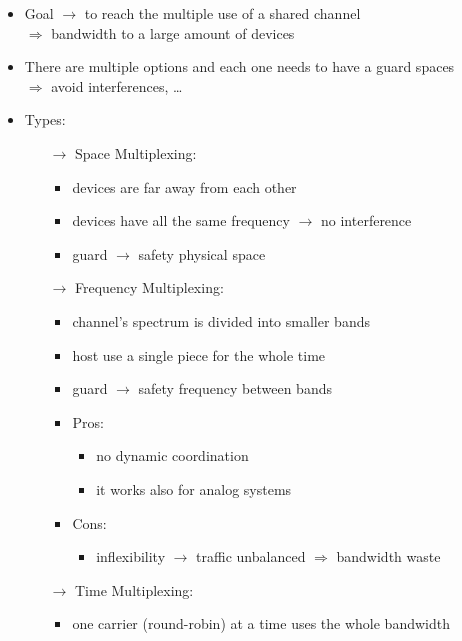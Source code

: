 \begin{itemize}
    \item Goal $\rightarrow$ to reach the multiple use of a shared channel\\
    $\Rightarrow$ bandwidth to a large amount of devices
    \item There are multiple options and each one needs to have a guard spaces\\
    $\Rightarrow$ avoid interferences, \dots
    \item Types:
    \begin{itemize}
        \item[$\rightarrow$] Space Multiplexing:
        \begin{itemize}
            \item devices are far away from each other
            \item devices have all the same frequency $\rightarrow$ no interference
            \item guard $\rightarrow$ safety physical space
        \end{itemize}
        \item[$\rightarrow$] Frequency Multiplexing:
        \begin{itemize}
            \item channel's spectrum is divided into smaller bands
            \item host use a single piece for the whole time
            \item guard $\rightarrow$ safety frequency between bands
            \item Pros:
            \begin{itemize}
                \item no dynamic coordination
                \item it works also for analog systems
            \end{itemize}
            \item Cons:
            \begin{itemize}
                \item inflexibility $\rightarrow$ traffic unbalanced $\Rightarrow$ bandwidth waste
            \end{itemize}
        \end{itemize}
        \item[$\rightarrow$] Time Multiplexing:
        \begin{itemize}
            \item one carrier (round-robin) at a time uses the whole bandwidth

\end{itemize}
\end{itemize}
\end{itemize}
